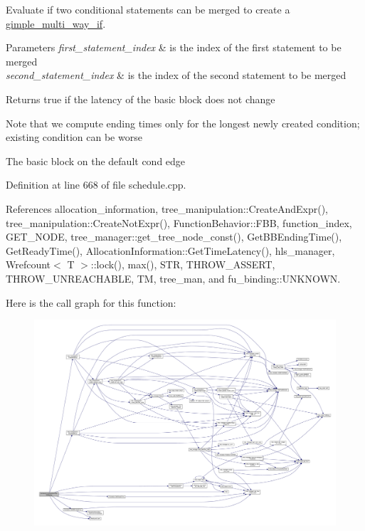Evaluate if two conditional statements can be merged to create a \hyperlink{structgimple__multi__way__if}{gimple\+\_\+multi\+\_\+way\+\_\+if}. 


\begin{DoxyParams}{Parameters}
{\em first\+\_\+statement\+\_\+index} & is the index of the first statement to be merged \\
\hline
{\em second\+\_\+statement\+\_\+index} & is the index of the second statement to be merged \\
\hline
\end{DoxyParams}
\begin{DoxyReturn}{Returns}
true if the latency of the basic block does not change 
\end{DoxyReturn}
Note that we compute ending times only for the longest newly created condition; existing condition can be worse

The basic block on the default cond edge 

Definition at line 668 of file schedule.\+cpp.



References allocation\+\_\+information, tree\+\_\+manipulation\+::\+Create\+And\+Expr(), tree\+\_\+manipulation\+::\+Create\+Not\+Expr(), Function\+Behavior\+::\+F\+BB, function\+\_\+index, G\+E\+T\+\_\+\+N\+O\+DE, tree\+\_\+manager\+::get\+\_\+tree\+\_\+node\+\_\+const(), Get\+B\+B\+Ending\+Time(), Get\+Ready\+Time(), Allocation\+Information\+::\+Get\+Time\+Latency(), hls\+\_\+manager, Wrefcount$<$ T $>$\+::lock(), max(), S\+TR, T\+H\+R\+O\+W\+\_\+\+A\+S\+S\+E\+RT, T\+H\+R\+O\+W\+\_\+\+U\+N\+R\+E\+A\+C\+H\+A\+B\+LE, TM, tree\+\_\+man, and fu\+\_\+binding\+::\+U\+N\+K\+N\+O\+WN.

Here is the call graph for this function\+:
\nopagebreak
\begin{figure}[H]
\begin{center}
\leavevmode
\includegraphics[width=350pt]{df/d61/classSchedule_a735a5c3680d2fac0b2de19e734bc8a96_cgraph}
\end{center}
\end{figure}
\mbox{\label{classSchedule_a7b6c9b65b093277adc5fa53e8b10f551}} 
